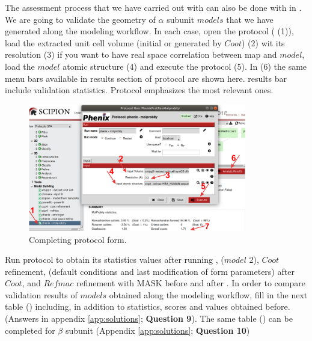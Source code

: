  The assessment process that we have carried out with \emringer can also be done with \molprobity in \scipion. We are going to validate the geometry of  $\alpha$ subunit $models$ that we have generated along the modeling workflow. In each case, open the  protocol ( (1)), load the extracted unit cell volume (initial or generated by $Coot$) (2) wit its resolution (3) if you want to have real space correlation between map and $model$, load the $model$ atomic structure (4) and execute the protocol (5). In  (6) the same menu bars available in results section of \phenix {} protocol are shown here. \molprobity results bar include validation statistics. Protocol  emphasizes the most relevant ones.\\
 
 \begin{figure}[H]
  \centering 
  \captionsetup{width=.7\linewidth} 
  \includegraphics[width=0.85\textwidth]{Images/Fig35}
  \caption{Completing \molprobity protocol form.}
  \label{fig:molprobity_protocol}
  \end{figure}
  
  Run \molprobity protocol to obtain its statistics values after running , \chimera {} ($model$ 2), $Coot$ refinement, \phenix {} (default conditions and last modification of form parameters) after $Coot$, and $Refmac$ refinement with MASK before and after \phenix {}. In order to compare validation results of $models$ obtained along the modeling workflow, fill in the next table () including, in addition to \molprobity statistics, \emringer scores and \ccmask values obtained before. (Answers in appendix \ref{app:solutions}; \textbf{Question 9}). The same table () can be completed for  $\beta$ subunit (Appendix \ref{app:solutions}; \textbf{Question 10})\\
  

